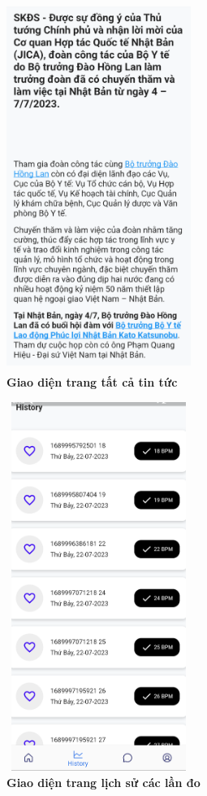 \begin{figure}[H]
  \centering
  \includegraphics[width=6cm,height=12cm]{Images/mobile_app/demo/detail_news.png}
  \caption[Giao diện trang tất cả tin tức]{\bfseries \fontsize{12pt}{0pt}\selectfont Giao diện trang tất cả tin tức}
  \label{demo_} %
\end{figure}

\begin{figure}[H]
  \centering
  \includegraphics[width=6cm,height=12cm]{Images/mobile_app/demo/history.png}
  \caption[Giao diện trang lịch sử các lần đo]{\bfseries \fontsize{12pt}{0pt}\selectfont Giao diện trang lịch sử các lần đo}
  \label{demo_} %
\end{figure}

